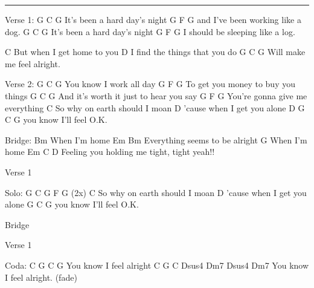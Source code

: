 \noindent\rule{\columnwidth}{1pt}

\begin{multicols}{2}
\begin{lstsong}
Verse 1:
            G    C     G
It's been a hard day's night
G             F              G
and I've been working like a dog.
            G    C     G
It's been a hard day's night
G           F               G
I should be sleeping like a log.

           C
But when I get home to you
           D
I find the things that you do
             G    C    G
Will make me feel alright.

Verse 2:
G               C   G
You know I work all day
G          F                G
To get you money to buy you things
G                         C        G
And it's worth it just to hear you say
G            F            G
You're gonna give me everything
           C
So why on earth should I moan
              D
'cause when I get you alone
D             G    C G
you know I'll feel O.K.
\end{lstsong}\vfill\columnbreak\begin{lstsong}
Bridge:
         Bm
When I'm home
Em                       Bm
Everything seems to be alright
         G
When I'm home
Em                     C      D
Feeling you holding me tight, tight yeah!!

Verse 1

Solo:
G  C   G   F   G (2x)
          C
So why on earth should I moan
              D
'cause when I get you alone
              G    C G
you know I'll feel O.K.

Bridge

Verse 1

Coda:
C           G    C G
 You know I feel alright
C           G    C  Dsus4  Dm7   Dsus4  Dm7
 You know I feel alright.    (fade)
\end{lstsong}
\end{multicols}
\newpage

